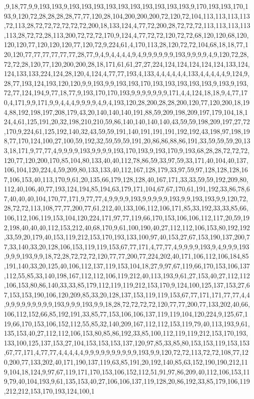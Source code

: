 ,9,18,77,9,9,193,193,9,193,193,193,193,193,193,193,193,193,193,9,170,193,193,170,193,9,120,72,28,28,28,28,77,77,120,28,104,200,200,200,72,120,72,104,113,113,113,113,72,113,28,72,72,72,72,72,72,200,18,133,124,4,77,72,200,28,72,72,72,113,113,113,113,113,28,72,72,28,113,200,72,72,72,170,9,124,4,77,72,72,120,72,72,68,120,120,68,120,120,120,77,120,120,120,77,120,72,9,224,61,4,170,113,28,120,72,72,104,68,18,18,77,120,120,77,77,77,77,77,77,28,77,9,4,9,4,4,4,4,9,4,9,9,9,9,9,9,193,9,9,9,9,4,9,120,72,28,72,72,28,120,77,120,200,200,28,18,171,61,61,27,27,224,124,124,124,124,124,133,124,124,133,133,224,124,28,120,4,124,4,77,77,193,4,133,4,4,4,4,4,4,133,4,4,4,4,4,9,124,9,28,77,193,124,193,120,120,9,9,193,9,9,193,193,170,193,193,193,193,193,9,193,9,193,72,77,124,194,9,77,18,77,9,193,170,170,193,9,9,9,9,9,9,9,171,4,4,124,18,18,9,4,77,170,4,171,9,9,171,9,9,4,4,4,9,9,9,9,4,9,4,193,120,28,200,28,28,200,120,77,120,200,18,194,88,192,198,197,208,179,43,20,140,140,140,191,88,59,209,198,209,197,179,104,18,124,4,61,125,191,20,32,198,210,210,59,86,140,140,140,140,43,59,59,198,209,197,27,72,170,9,224,61,125,192,140,32,43,59,59,191,140,191,191,191,192,192,43,198,97,198,198,77,170,124,100,27,100,59,192,32,59,59,59,191,20,86,86,88,86,191,33,59,59,59,20,133,18,171,9,77,77,4,9,9,9,9,193,9,9,9,9,193,170,193,9,193,170,9,193,68,28,28,72,72,72,120,77,120,200,170,85,104,80,133,40,40,112,78,86,59,33,97,59,33,171,40,104,40,137,106,104,120,224,4,59,209,80,133,133,40,112,167,128,179,33,97,59,97,128,128,128,167,106,153,40,113,170,9,61,20,135,66,179,128,128,40,167,171,33,33,59,59,192,209,80,112,40,106,40,77,193,124,194,85,194,63,179,171,104,67,67,170,61,191,192,33,86,78,67,40,40,40,104,170,77,171,9,77,77,4,9,9,9,9,193,9,9,9,9,9,193,9,9,193,193,9,9,120,72,28,72,72,113,108,77,77,200,77,61,212,40,133,106,112,106,171,85,33,192,33,33,85,66,106,112,106,119,153,104,120,224,171,97,77,119,66,170,153,106,106,112,117,20,59,192,198,40,40,40,112,153,212,40,68,170,9,61,100,190,40,27,112,112,106,153,80,192,192,33,59,20,179,40,153,119,212,153,170,193,133,100,97,40,153,27,67,153,190,137,200,77,33,140,33,20,128,106,153,119,119,153,67,77,171,4,77,77,4,9,9,9,9,193,9,4,9,9,9,193,9,9,9,193,9,9,18,72,28,72,72,72,120,77,77,200,77,224,202,40,171,106,112,106,184,85,191,140,33,20,125,40,106,112,137,119,153,104,18,27,9,97,67,119,66,170,153,106,137,112,55,85,33,140,198,167,112,112,106,119,212,40,113,193,9,61,27,153,40,27,112,112,106,153,80,86,140,33,33,85,179,112,119,119,212,153,170,9,124,100,125,137,153,27,67,153,153,190,106,120,209,85,33,20,128,137,153,119,119,153,67,77,171,171,77,77,4,4,9,9,9,9,9,9,9,9,9,193,9,9,9,193,9,9,18,28,72,72,72,72,120,77,77,200,77,133,202,40,66,106,112,152,66,85,192,191,33,85,77,153,106,106,137,119,119,104,120,224,9,125,67,119,66,170,153,106,152,112,55,85,32,140,209,167,112,112,153,119,79,40,113,193,9,61,135,153,40,27,112,112,106,153,80,85,86,192,33,85,100,112,119,119,212,153,170,193,133,100,125,137,153,27,104,153,153,153,137,120,97,85,33,85,80,153,153,119,153,153,67,77,171,4,77,77,4,4,4,4,4,9,9,9,9,9,9,9,9,9,9,193,9,9,120,72,72,113,72,72,108,77,120,200,77,133,202,40,171,190,137,119,63,85,191,20,192,140,85,63,152,190,190,212,119,104,18,124,9,97,67,119,171,170,153,106,152,112,51,91,97,86,209,40,112,106,153,119,79,40,104,193,9,61,135,153,40,27,106,106,137,119,128,20,86,192,33,85,179,106,119,212,212,153,170,193,124,100,1